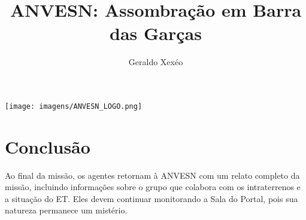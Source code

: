 \documentclass[a4paper,12pt]{book}
\title{ANVESN: Assombração em Barra das Garças}
\author{Geraldo Xexéo}
\date{}
\begin{document}


\maketitle
\begin{center}
\newpage
\vspace*{\fill}
\texttt{[image: imagens/ANVESN\_LOGO.png]}
\vspace*{\fill}
\newpage
\end{center}
\tableofcontents









\chapter{Conclusão}

Ao final da missão, os agentes retornam à ANVESN com um relato completo da missão, incluindo informações sobre o grupo que colabora com os intraterrenos e a situação do ET. Eles devem continuar monitorando a Sala do Portal, pois sua natureza permanece um mistério.





\appendix



\printindex
\end{document}
